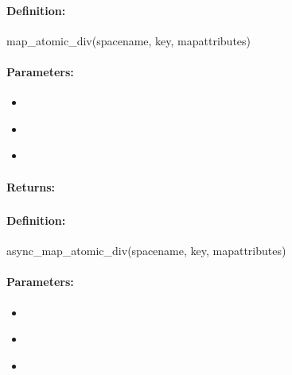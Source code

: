 \paragraph{Definition:}
\begin{rubycode}
map_atomic_div(spacename, key, mapattributes)
\end{rubycode}

\paragraph{Parameters:}
\begin{itemize}[noitemsep]
\item {}\\

\item {}\\

\item {}\\

\end{itemize}

\paragraph{Returns:}


\pagebreak
\subsubsection{}
\label{api:ruby:async_map_atomic_div}


\paragraph{Definition:}
\begin{rubycode}
async_map_atomic_div(spacename, key, mapattributes)
\end{rubycode}

\paragraph{Parameters:}
\begin{itemize}[noitemsep]
\item {}\\

\item {}\\

\item {}\\

\end{itemize}

